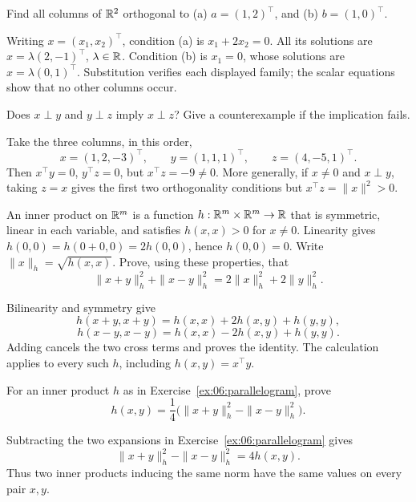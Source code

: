 \begin{problem}\label{ex:06:orthogonal-r2}
Find all columns of \(\mathbb R^2\) orthogonal to
(a) \(a=(1,2)^\top\), and (b) \(b=(1,0)^\top\).
\end{problem}
\begin{solution}
Writing \(x=(x_1,x_2)^\top\), condition (a) is \(x_1+2x_2=0\).
All its solutions are \(x=\lambda(2,-1)^\top\), \(\lambda\in\mathbb R\).
Condition (b) is \(x_1=0\), whose solutions are
\(x=\lambda(0,1)^\top\).
Substitution verifies each displayed family; the scalar equations show
that no other columns occur.
\end{solution}

\begin{problem}\label{ex:06:nontransitivity}
Does \(x\perp y\) and \(y\perp z\) imply \(x\perp z\)?
Give a counterexample if the implication fails.
\end{problem}
\begin{solution}
Take the three columns, in this order,
\[
x=(1,2,-3)^\top,\qquad y=(1,1,1)^\top,\qquad z=(4,-5,1)^\top.
\]
Then \(x^\top y=0\), \(y^\top z=0\), but \(x^\top z=-9\ne0\).
More generally, if \(x\ne0\) and \(x\perp y\), taking \(z=x\) gives
the first two orthogonality conditions but \(x^\top z=\|x\|^2>0\).
\end{solution}

\begin{problem}\label{ex:06:parallelogram}
An inner product on \(\mathbb R^m\) is a function
\(h:\mathbb R^m\times\mathbb R^m\to\mathbb R\) that is symmetric, linear in each variable,
and satisfies \(h(x,x)>0\) for \(x\ne0\).
Linearity gives \(h(0,0)=h(0+0,0)=2h(0,0)\), hence \(h(0,0)=0\).
Write \(\|x\|_h=\sqrt{h(x,x)}\).
Prove, using these properties, that
\[
\|x+y\|_h^2+\|x-y\|_h^2=2\|x\|_h^2+2\|y\|_h^2.
\]
\end{problem}
\begin{solution}
Bilinearity and symmetry give
\[
h(x+y,x+y)=h(x,x)+2h(x,y)+h(y,y),
\]
\[
h(x-y,x-y)=h(x,x)-2h(x,y)+h(y,y).
\]
Adding cancels the two cross terms and proves the identity.
The calculation applies to every such \(h\), including \(h(x,y)=x^\top y\).
\end{solution}

\begin{problem}\label{ex:06:polarization}
For an inner product \(h\) as in Exercise~\ref{ex:06:parallelogram},
prove
\[
h(x,y)=\frac14\bigl(\|x+y\|_h^2-\|x-y\|_h^2\bigr).
\]
\end{problem}
\begin{solution}
Subtracting the two expansions in Exercise~\ref{ex:06:parallelogram}
gives
\[
\|x+y\|_h^2-\|x-y\|_h^2=4h(x,y).
\]
Thus two inner products inducing the same norm have the same values
on every pair \(x,y\).
\end{solution}

